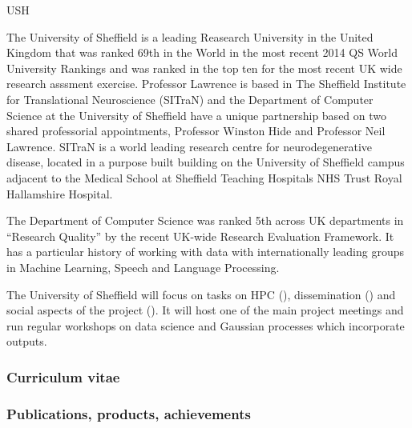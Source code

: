 \begin{sitedescription}{USH}



The University of Sheffield is a leading Reasearch University in the
United Kingdom that was ranked 69th in the World in the most recent
2014 QS World University Rankings and was ranked in the top ten for
the most recent UK wide research asssment exercise.  Professor
Lawrence is based in The Sheffield Institute for Translational
Neuroscience (SITraN) and the Department of Computer Science at the
University of Sheffield have a unique partnership based on two shared
professorial appointments, Professor Winston Hide and Professor Neil
Lawrence.  SITraN is a world leading research centre for
neurodegenerative disease, located in a purpose built building on the
University of Sheffield campus adjacent to the Medical School at
Sheffield Teaching Hospitals NHS Trust Royal Hallamshire Hospital. 

The Department of Computer Science was ranked 5th across UK
departments in ``Research Quality'' by the recent UK-wide Research
Evaluation Framework. It has a particular history of working with data
with internationally leading groups in Machine Learning, Speech and
Language Processing.

The University of Sheffield will focus on tasks on HPC (), dissemination () and social aspects of the project (). It will host one of the main project meetings and run regular workshops on data science and Gaussian processes which incorporate \TheProject outputs. 

\subsubsection*{Curriculum vitae}








%

\subsubsection*{Publications, products, achievements}


\end{sitedescription}
